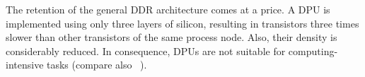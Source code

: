 The retention of the general \ac{DDR} architecture comes at a price.
A \ac{DPU} is implemented using only three layers of silicon, resulting in transistors three times slower than other transistors of the same process node.
Also, their density is considerably reduced.
In consequence, \acp{DPU} are not suitable for computing-intensive tasks (compare also \citeauthor{mutlu2022Benchmarking}~\cite{mutlu2022Benchmarking}).
